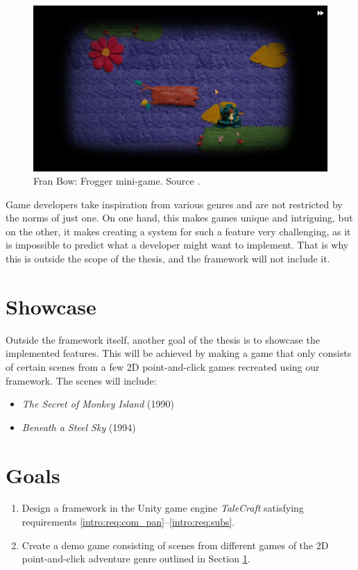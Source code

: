 \begin{figure}[H]
\centering
\includegraphics[width=.8\linewidth]{img/FB_BF2.png}
\caption{Fran Bow: Frogger mini-game. Source \cite{FranBow}.}
\label{fig:UF-FB2}
\end{figure}

\begin{notImplemented}
 \par
\vspace{3mm}
Game developers take inspiration from various genres and are not restricted by the norms of just one. On one hand, this makes games unique and intriguing, but on the other, it makes creating a system for such a feature very challenging, as it is impossible to predict what a developer might want to implement. That is why this is outside the scope of the thesis, and the framework will not include it. 
\end{notImplemented}


\section{Showcase}
\label{intro:showcase}
Outside the framework itself, another goal of the thesis is to showcase the implemented features. This will be achieved by making a game that only consists of certain scenes from a few 2D point-and-click games recreated using our framework. The scenes will include:
\begin{itemize}
    \item \textit{The Secret of Monkey Island} (1990)
    \item \textit{Beneath a Steel Sky} (1994)
\end{itemize}

\section{Goals}
\label{intro:goals}
\begin{enumerate}[label=\color{orange}\textbf{G{\arabic*}}]
  \item \label{intro:goals:framework} 
  Design a framework in the Unity game engine \textit{TaleCraft} satisfying requirements \ref{intro:req:com_pan}--\ref{intro:req:subs}.
  \item \label{intro:goals:demo} Create a demo game consisting of scenes from different games of the 2D point-and-click adventure genre outlined in Section \ref{intro:showcase}.
\end{enumerate}
